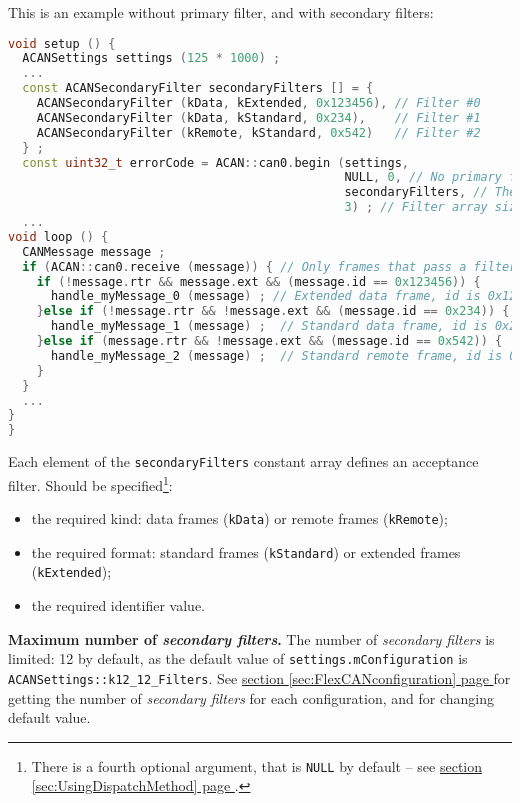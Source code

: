 \documentclass[10pt, a4paper, obeyspaces, openany]{extarticle}
\newcommand\refSectionPage[1]{\hyperref[sec:#1]{section \ref*{sec:#1} page \pageref{sec:#1}}}
\begin{document}
This is an example without primary filter, and with secondary filters:
{ \small\begin{lstlisting}[language=c++]
void setup () {
  ACANSettings settings (125 * 1000) ;
  ...
  const ACANSecondaryFilter secondaryFilters [] = {
    ACANSecondaryFilter (kData, kExtended, 0x123456), // Filter #0
    ACANSecondaryFilter (kData, kStandard, 0x234),    // Filter #1
    ACANSecondaryFilter (kRemote, kStandard, 0x542)   // Filter #2
  } ;
  const uint32_t errorCode = ACAN::can0.begin (settings,
                                               NULL, 0, // No primary filter
                                               secondaryFilters, // The filter array
                                               3) ; // Filter array size
  ...
void loop () {
  CANMessage message ;
  if (ACAN::can0.receive (message)) { // Only frames that pass a filter are retrieved
    if (!message.rtr && message.ext && (message.id == 0x123456)) {
      handle_myMessage_0 (message) ; // Extended data frame, id is 0x123456
    }else if (!message.rtr && !message.ext && (message.id == 0x234)) {
      handle_myMessage_1 (message) ;  // Standard data frame, id is 0x234
    }else if (message.rtr && !message.ext && (message.id == 0x542)) {
      handle_myMessage_2 (message) ;  // Standard remote frame, id is 0x542
    }
  }
  ...
}
}
\end{lstlisting}}

Each element of the \texttt{secondaryFilters} constant array defines an acceptance filter. Should be specified\footnote{There is a fourth optional argument, that is \texttt{NULL} by default -- see \refSectionPage{UsingDispatchMethod}.}:
\begin{itemize}
  \item the required kind: data frames (\texttt{kData}) or remote frames (\texttt{kRemote});
  \item the required format: standard frames (\texttt{kStandard}) or extended frames (\texttt{kExtended});
  \item the required identifier value.
\end{itemize}

{\bf Maximum number of \emph{secondary filters}.} The number of \emph{secondary filters} is limited: 12 by default, as the default value of \texttt{settings.mConfiguration} is \texttt{ACANSettings::k12\_12\_Filters}. See \refSectionPage{FlexCANconfiguration} for getting the number of \emph{secondary filters} for each configuration, and for changing default value.
\end{document}

